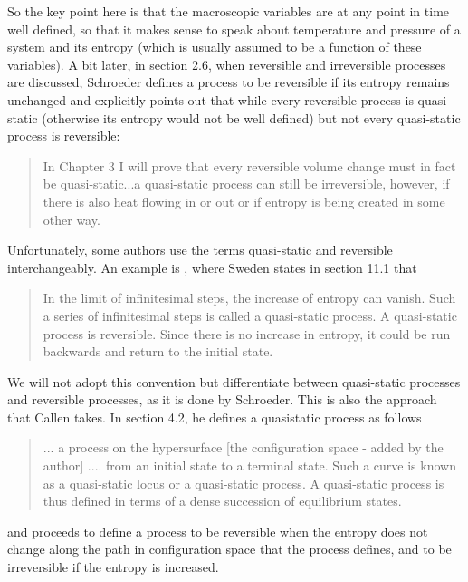 \documentclass[a4paper, draft]{article}
\theoremstyle{own}
\theoremstyle{remark}
\begin{document}
So the key point here is that the macroscopic variables are at any point in time well defined, so that it makes sense to speak about temperature and pressure of a system and its entropy (which is usually assumed to be a function of these variables). A bit later, in section 2.6, when reversible and irreversible processes are discussed, Schroeder defines a process to be reversible if its entropy remains unchanged and explicitly points out that while every reversible process is quasi-static (otherwise its entropy would not be well defined) but not every quasi-static process is reversible:

\begin{quote}
	In Chapter 3 I will prove that every reversible volume change must in fact be quasi-static...a quasi-static process can still be irreversible, however, if there is also heat flowing in or out or if  entropy is being created in some other way.
\end{quote}

Unfortunately, some authors use the terms quasi-static and reversible interchangeably. An example is \cite{Sweden}, where Sweden states in section 11.1 that

\begin{quote}
In the limit of infinitesimal steps, the increase of entropy can vanish. Such a series of infinitesimal steps is called a quasi-static process. A quasi-static process is reversible. Since there is no increase in entropy, it could be run backwards and return to the initial state.
\end{quote}

We will not adopt this convention but differentiate between quasi-static processes and reversible processes, as it is done by Schroeder. This is also the approach that Callen takes. In \cite{Callen} section 4.2, he defines a quasistatic process as follows 

\begin{quote}
... a process on the hypersurface [the configuration space - added by the author] .... from an initial state to a terminal state. Such a curve is known as a quasi-static locus or a quasi-static process. A quasi-static process is thus defined in terms of a dense succession of equilibrium states.
\end{quote}

and proceeds to define a process to be reversible when the entropy does not change along the path in configuration space that the process defines, and to be irreversible if the entropy is increased.
\end{document}
